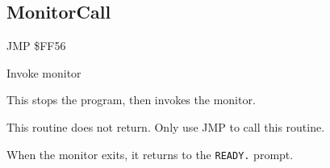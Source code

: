 \subsection{MonitorCall}
\label{KERNAL Jump Table!MonitorCall}
\begin{description}[leftmargin=2cm,style=nextline]
    \item [Address:] JMP \$FF56
    \item [Description:] Invoke monitor
    \item [Remarks:]
        This stops the program, then invokes the monitor.

        This routine does not return. Only use JMP to call this routine.

        When the monitor exits, it returns to the \texttt{READY.} prompt.
    \item [Example:]
\end{description}



\newpage
